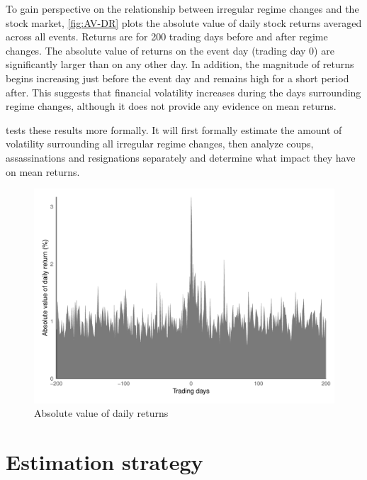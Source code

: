 \documentclass[12pt,final,fleqn]{article}
\theoremstyle{plain}
\begin{document}
To gain perspective on the relationship between irregular regime changes and the stock market, \autoref{fig:AV-DR} plots the absolute value of daily stock returns averaged across all events. Returns are for 200 trading days before and after regime changes. The absolute value of returns on the event day (trading day 0) are significantly larger than on any other day. In addition, the magnitude of returns begins increasing just before the event day and remains high for a short period after. This suggests that financial volatility increases during the days surrounding regime changes, although it does not provide any evidence on mean returns.

 tests these results more formally. It will first formally estimate the amount of volatility surrounding all irregular regime changes, then analyze coups, assassinations and resignations separately and determine what impact they have on mean returns.

\begin{figure}[!ht]
\includegraphics{../figs/daily_mean_absreturn.pdf}
\caption{Absolute value of daily returns}
\label{fig:AV-DR}
\end{figure}

\section{Estimation strategy} \label{sec: estimation}
\end{document}

